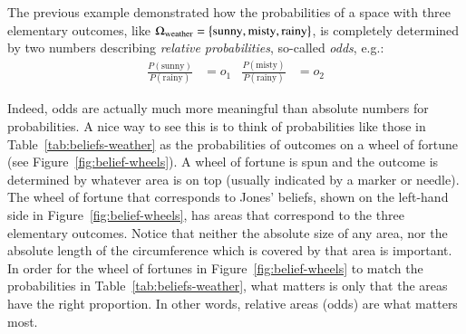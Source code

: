 \documentclass[nobib,nofonts]{tufte-handout}
\begin{document}
The previous example demonstrated how the probabilities of a space with three elementary outcomes, like $\Omega_{\text{weather}} = \left\{\text{sunny}, \text{misty}, \text{rainy}\right\}$, is completely determined by two numbers describing \emph{relative probabilities}, so-called \emph{odds}, e.g.:
\begin{align*}
  \frac{P(\text{sunny})}{P(\text{rainy})} & = o_{1} & \frac{P(\text{misty})}{P(\text{rainy})} & = o_{2}
\end{align*}

Indeed, odds are actually much more meaningful than absolute numbers for probabilities.
A nice way to see this is to think of probabilities like those in Table~\ref{tab:beliefs-weather} as the probabilities of outcomes on a wheel of fortune (see Figure~\ref{fig:belief-wheels}).
A wheel of fortune is spun and the outcome is determined by whatever area is on top (usually indicated by a marker or needle).
The wheel of fortune that corresponds to Jones' beliefs, shown on the left-hand side in Figure~\ref{fig:belief-wheels}, has areas that correspond to the three elementary outcomes.
Notice that neither the absolute size of any area, nor the absolute length of the circumference which is covered by that area is important.
In order for the wheel of fortunes in Figure~\ref{fig:belief-wheels} to match the probabilities in Table~\ref{tab:beliefs-weather}, what matters is only that the areas have the right proportion.
In other words, relative areas (odds) are what matters most.
\end{document}

